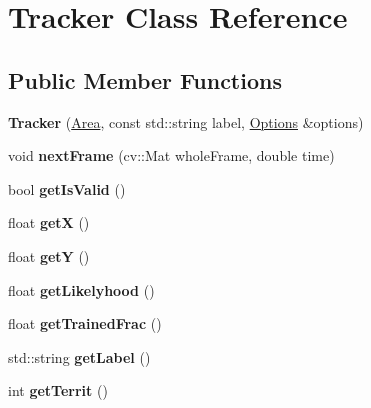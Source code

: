 \hypertarget{classTracker}{\section{Tracker Class Reference}
\label{classTracker}
}
\subsection*{Public Member Functions}
\begin{DoxyCompactItemize}
\item 
\hypertarget{classTracker_afd3365f1a661b0d96ed091b1250ade34}{{\bfseries Tracker} (\hyperlink{classArea}{Area}, const std\-::string label, \hyperlink{structOptions}{Options} \&options)}\label{classTracker_afd3365f1a661b0d96ed091b1250ade34}

\item 
\hypertarget{classTracker_af8b257a9a2d5869d9a3c10448170dfe0}{void {\bfseries next\-Frame} (cv\-::\-Mat whole\-Frame, double time)}\label{classTracker_af8b257a9a2d5869d9a3c10448170dfe0}

\item 
\hypertarget{classTracker_a12bd9002e4999442279594633277692c}{bool {\bfseries get\-Is\-Valid} ()}\label{classTracker_a12bd9002e4999442279594633277692c}

\item 
\hypertarget{classTracker_a16d848b52d9d22537e383491d7bd57ae}{float {\bfseries get\-X} ()}\label{classTracker_a16d848b52d9d22537e383491d7bd57ae}

\item 
\hypertarget{classTracker_ac3c91b671be24b2ddca67dc95d08200a}{float {\bfseries get\-Y} ()}\label{classTracker_ac3c91b671be24b2ddca67dc95d08200a}

\item 
\hypertarget{classTracker_a48ac1ec6775187764fea452a78a91b18}{float {\bfseries get\-Likelyhood} ()}\label{classTracker_a48ac1ec6775187764fea452a78a91b18}

\item 
\hypertarget{classTracker_aa85827fe11d16eb2f5e28534b04d8270}{float {\bfseries get\-Trained\-Frac} ()}\label{classTracker_aa85827fe11d16eb2f5e28534b04d8270}

\item 
\hypertarget{classTracker_af1e6e9c0c7f279d90739faa8f6866525}{std\-::string {\bfseries get\-Label} ()}\label{classTracker_af1e6e9c0c7f279d90739faa8f6866525}

\item 
\hypertarget{classTracker_a9f4bea276b87d8659d948fa78e1e08d4}{int {\bfseries get\-Territ} ()}\label{classTracker_a9f4bea276b87d8659d948fa78e1e08d4}


\end{DoxyCompactItemize}
